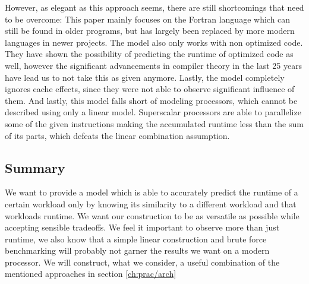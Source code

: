 \documentclass[../bachelor_paper.tex]{subfiles}
\begin{document}
However, as elegant as this approach seems, there are still shortcomings that need to be overcome: This paper mainly focuses on the Fortran language which can still be found in older programs, but has largely been replaced by more modern languages in newer projects. The model also only works with non optimized code. They have shown the possibility of predicting the runtime of optimized code as well, however the significant advancements in compiler theory in the last 25 years have lead us to not take this as given anymore. Lastly, the model completely ignores cache effects, since they were not able to observe significant influence of them. And lastly, this model falls short of modeling processors, which cannot be described using only a linear model. Superscalar processors are able to parallelize some of the given instructions making the accumulated runtime less than the sum of its parts, which defeats the linear combination assumption.

\subsection{Summary}
	\label{ch:theo/simi/summ}
We want to provide a model which is able to accurately predict the runtime of a certain workload only by knowing its similarity to a different workload and that workloads runtime. We want our construction to be as versatile as possible while accepting sensible tradeoffs. We feel it important to observe more than just runtime, we also know that a simple linear construction and brute force benchmarking will probably not garner the results we want on a modern processor. We will construct, what we consider, a useful combination of the mentioned approaches in section \ref{ch:prac/arch}



\isstandalone



\fi
\end{document}

